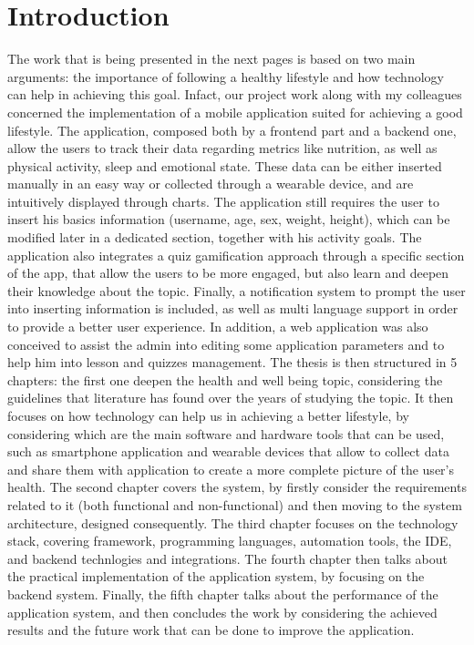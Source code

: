 \section*{Introduction}
The work that is being presented in the next pages is based on two main arguments: the importance of following a healthy lifestyle and how technology can help in achieving this goal. Infact, our project work along with my colleagues concerned the implementation of a mobile application suited for achieving a good lifestyle. The application, composed both by a frontend part and a backend one, allow the users to track their data regarding metrics like nutrition, as well as physical activity, sleep and emotional state. These data can be either inserted manually in an easy way or collected through a wearable device, and are intuitively displayed through charts. The application still requires the user to insert his basics information (username, age, sex, weight, height), which can be modified later in a dedicated section, together with his activity goals. The application also integrates a quiz gamification approach through a specific section of the app, that allow the users to be more engaged, but also learn and deepen their knowledge about the topic. Finally, a notification system to prompt the user into inserting information is included, as well as multi language support in order to provide a better user experience. In addition, a web application was also conceived to assist the admin into editing some application parameters and to help him into lesson and quizzes management. The thesis is then structured in 5 chapters: the first one deepen the health and well being topic, considering the guidelines that literature has found over the years of studying the topic. It then focuses on how technology can help us in achieving a better lifestyle, by considering which are the main software and hardware tools that can be used, such as smartphone application and wearable devices that allow to collect data and share them with application to create a more complete picture of the user's health. The second chapter covers the system, by firstly consider the requirements related to it (both functional and non-functional) and then moving to the system architecture, designed consequently. The third chapter focuses on the technology stack, covering framework, programming languages, automation tools, the IDE, and backend technlogies and integrations. The fourth chapter then talks about the practical implementation of the application system, by focusing on the backend system. Finally, the fifth chapter talks about the performance of the application system, and then concludes the work by considering the achieved results and the future work that can be done to improve the application.